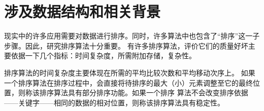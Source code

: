 \section{涉及数据结构和相关背景}
现实中的许多应用需要对数据进行排序。同时，许多算法中也包含了“排序”这一子步骤。因此，研究排序算法十分重要。
有许多排序算法，评价它们的质量好坏主要依据一下几个指标：时间复杂度，所需附加存储，复杂性。

排序算法的时间复杂度主要体现在所需的平均比较次数和平均移动次序上。
如果一个排序算法在排序过程中，会直接将待排序的最大（小）元素调整至它的最终位置，则称该排序算法具有部分排序功能。如果一个排序
算法不会改变排序依据——关键字——相同的数据的相对位置，则称该排序算法具有稳定性。